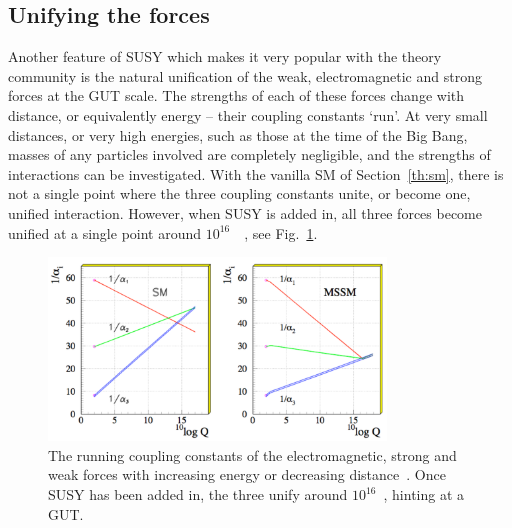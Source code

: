 
\subsection{Unifying the forces}

Another feature of \ac{SUSY} which makes it very popular with the theory community 
is the natural unification of the weak, electromagnetic and strong forces at the \ac{GUT} scale.
The strengths of each of these forces change with distance, or equivalently energy -- their coupling constants `run'. 
At very small distances, or very high energies, such as those at the time of the Big Bang, masses of any particles involved are completely negligible, and the strengths of interactions can be investigated.
With the vanilla \ac{SM} of Section~\ref{th:sm}, there is not a single point where the three coupling constants unite, or become one, unified interaction. 
However, when \ac{SUSY} is added in, all three forces become unified at a single point around $10^{16}$~\GeV~\cite{GUT}, see Fig.~\ref{fig:SUSgut}.

\begin{figure}[htbp]
  \begin{center}
  \includegraphics[width=0.8\textwidth]{Figures/theory/GUTunification}
  \caption{The running coupling constants of the electromagnetic, strong and weak forces with increasing energy or decreasing distance~\cite{GUTpic}. Once \ac{SUSY} has been added in, the three unify around $10^{16}$~\GeV, hinting at a \ac{GUT}.}
  \label{fig:SUSgut}
  \end{center}
\end{figure}

